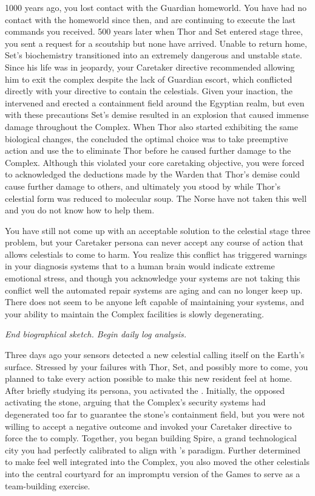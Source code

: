 \documentclass[char]{guardians}
\begin{document}
1000 years ago, you lost contact with the Guardian homeworld. You have had no contact with the homeworld since then, and are continuing to execute the last commands you received. 500 years later when Thor and Set entered stage three, you sent a request for a scoutship but none have arrived. Unable to return home, Set's biochemistry transitioned into an extremely dangerous and unstable state. Since his life was in jeopardy, your Caretaker directive recommended allowing him to exit the complex despite the lack of Guardian escort, which conflicted directly with your directive to contain the celestials. Given your inaction, the \cWarden{} intervened and erected a containment field around the Egyptian realm, but even with these precautions Set's demise resulted in an explosion that caused immense damage throughout the Complex. When Thor also started exhibiting the same biological changes, the \cWarden{} concluded the optimal choice was to take preemptive action and use the \assembler{} to eliminate Thor before he caused further damage to the Complex. Although this violated your core caretaking objective, you were forced to acknowledged the deductions made by the Warden that Thor's demise could cause further damage to others, and ultimately you stood by while Thor's celestial form was reduced to molecular soup. The Norse have not taken this well and you do not know how to help them.

You have still not come up with an acceptable solution to the celestial stage three problem, but your Caretaker persona can never accept any course of action that allows celestials to come to harm. You realize this conflict has triggered warnings in your diagnosis systems that to a human brain would indicate extreme emotional stress, and though you acknowledge your systems are not taking this conflict well the automated repair systems are aging and can no longer keep up. There does not seem to be anyone left capable of maintaining your systems, and your ability to maintain the Complex facilities is slowly degenerating.

\emph{End biographical sketch. Begin daily log analysis.}

Three days ago your sensors detected a new celestial calling itself \cUnity{} on the Earth's surface. Stressed by your failures with Thor, Set, and possibly more to come, you planned to take every action possible to make this new resident feel at home. After briefly studying its persona, you activated the \stone{}. Initially, the \cWarden{} opposed activating the stone, arguing that the Complex's security systems had degenerated too far to guarantee the stone's containment field, but you were not willing to accept a negative outcome and invoked your Caretaker directive to force the \cWarden{} to comply. Together, you began building Spire, a grand technological city you had perfectly calibrated to align with \cUnity{}'s paradigm. Further determined to make \cUnity{} feel well integrated into the Complex, you also moved the other celestials into the central courtyard for an impromptu version of the Games to serve as a team-building exercise.
\end{document}
